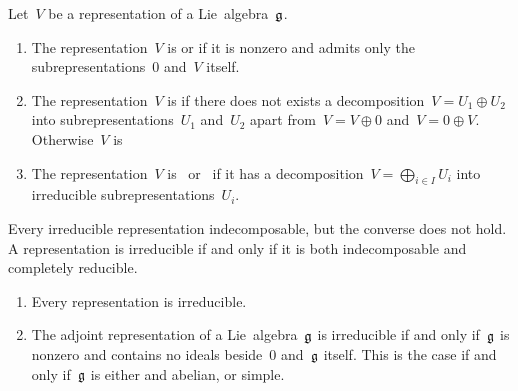 \begin{definition}
  Let~$V$ be a representation of a Lie~algebra~$\mathfrak{g}$.
  \begin{enumerate}
    \item
      The representation~$V$ is  or  if it is nonzero and admits only the subrepresentations~$0$ and~$V$ itself.
    \item
      The representation~$V$ is  if there does not exists a decomposition~$V = U_1 \oplus U_2$ into subrepresentations~$U_1$ and~$U_2$ apart from~$V = V \oplus 0$ and~$V = 0 \oplus V$.
      Otherwise~$V$ is 
    \item
      The representation~$V$ is~ or~ if it has a decomposition~$V = \bigoplus_{i \in I} U_i$ into irreducible subrepresentations~$U_i$.
  \end{enumerate}
\end{definition}


\begin{remark}
  Every irreducible representation indecomposable, but the converse does not hold.
  A representation is irreducible if and only if it is both indecomposable and completely reducible.
\end{remark}


\begin{example}
  \leavevmode
  \begin{enumerate}
    \item
      Every {\onedimensional} representation is irreducible.
    \item
      The adjoint representation of a Lie~algebra~$\mathfrak{g}$ is irreducible if and only if~$\mathfrak{g}$ is nonzero and contains no ideals beside~$0$ and~$\mathfrak{g}$ itself.
      This is the case if and only if~$\mathfrak{g}$ is either {\onedimensional} and abelian, or simple.
  \end{enumerate}
\end{example}


